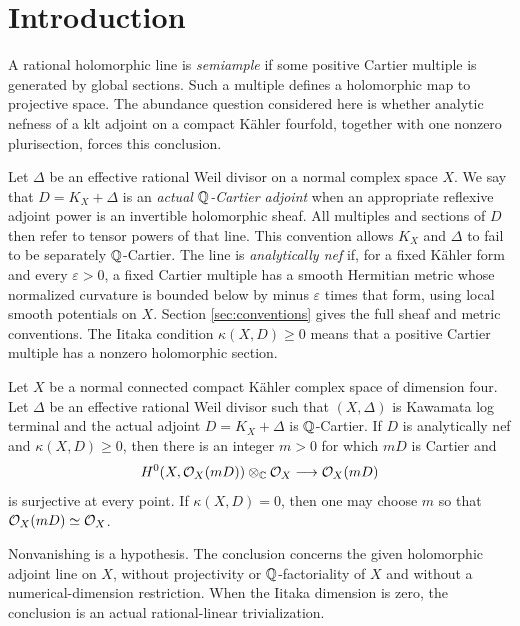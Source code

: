 \section{Introduction}\label{sec:introduction}

A rational holomorphic line is \emph{semiample} if some positive Cartier
multiple is generated by global sections.  Such a multiple defines a
holomorphic map to projective space.  The abundance question considered
here is whether analytic nefness of a klt adjoint on a compact K\"ahler
fourfold, together with one nonzero plurisection, forces this conclusion.

Let \(\Delta\) be an effective rational Weil divisor on a normal complex
space \(X\).  We say that \(D=K_X+\Delta\) is an \emph{actual
\(\mathbb Q\)-Cartier adjoint} when an appropriate reflexive adjoint power is an
invertible holomorphic sheaf.  All multiples and sections of \(D\) then
refer to tensor powers of that line.  This convention allows \(K_X\) and
\(\Delta\) to fail to be separately \(\mathbb Q\)-Cartier.  The line is
\emph{analytically nef} if, for a fixed K\"ahler form and every
\(\varepsilon>0\), a fixed Cartier multiple has a smooth Hermitian metric
whose normalized curvature is bounded below by minus \(\varepsilon\)
times that form, using local smooth potentials on \(X\).  Section
\ref{sec:conventions} gives the full sheaf and metric conventions.
The Iitaka condition \(\kappa(X,D)\geq0\) means that a positive Cartier
multiple has a nonzero holomorphic section.

\begin{theorem}\label{thm:main}
Let \(X\) be a normal connected compact K\"ahler complex space of
dimension four.  Let \(\Delta\) be an effective rational Weil divisor such
that \((X,\Delta)\) is Kawamata log terminal and the actual adjoint
\(D=K_X+\Delta\) is \(\mathbb Q\)-Cartier.  If \(D\) is analytically nef and
\(\kappa(X,D)\geq0\), then there is an integer \(m>0\) for which
\(mD\) is Cartier and
\[
 H^0(X,\mathcal O_X(mD))\otimes_\mathbb C\mathcal O_X\longrightarrow\mathcal O_X(mD)
\]
is surjective at every point.  If \(\kappa(X,D)=0\), then one may choose
\(m\) so that \(\mathcal O_X(mD)\simeq\mathcal O_X\).
\end{theorem}

Nonvanishing is a hypothesis.  The conclusion concerns the given
holomorphic adjoint line on \(X\), without projectivity or
\(\mathbb Q\)-factoriality of \(X\) and without a numerical-dimension
restriction.  When the Iitaka dimension is zero, the conclusion is an
actual rational-linear trivialization.


